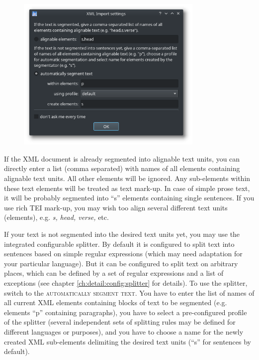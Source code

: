 \documentclass[a4paper,10pt,oneside]{book}
\newcommand{\menu}[1]{\textsc{#1}}
\begin{document}
\begin{figure}[htb]
 \includegraphics[width=0.8\textwidth]{screenshots/xml_import.png}
\end{figure}

If the XML document is already segmented into alignable text units, you can directly enter a list (comma separated) with names of all elements containing alignable text units. All other elements will be ignored. Any sub-elements within these text elements will be treated as text mark-up. In case of simple prose text, it will be probably segmented into ``s'' elements containing single sentences. If you use rich TEI mark-up, you may wish too align several different text units (elements), e.g. \emph{s, head, verse,} etc.

If your text is not segmented into the desired text units yet, you may use the integrated configurable splitter. By default it is configured to split text into sentences based on simple regular expressions (which may need adaptation for your particular language). But it can be configured to split text on arbitrary places, which can be defined by a set of regular expressions and a list of exceptions (see chapter \ref{ch:detail:config:splitter} for details). To use the splitter, switch to the \menu{automatically segment text}. You have to enter the list of names of all current XML elements containing blocks of text to be segmented (e.g. elements ``p'' containing paragraphs), you have to select a pre-configured profile of the splitter (several independent sets of splitting rules may be defined for different languages or purposes), and you have to choose a name for the newly created XML sub-elements delimiting the desired text units (``s'' for sentences by default).
\end{document}
